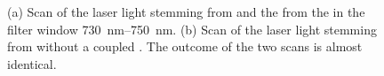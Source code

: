 		\begin{figure}[htp]
			\begin{subfigure}[t]{ 0.49\linewidth}
				\centering
				\caption{}
				\label{subfig::vcsel_excitation_with_diamond}
			\end{subfigure}
			\hfill
			\begin{subfigure}[t]{ 0.49\linewidth}
				\centering
				\caption{}
				\label{subfig::vcsel_excitation_without_diamond}
			\end{subfigure}
			\caption[Comparison of intensities between \BmFour and \BmTwo]{(a) Scan of the laser light stemming from \BmFour and the \fl from the \siv in the filter window \SIrange{730}{750}{nm}. (b) Scan of the laser light stemming from \BmTwo without a coupled \siv. The outcome of the two scans is almost identical.}
			\label{fig::vcsel_excitation}
		\end{figure}


